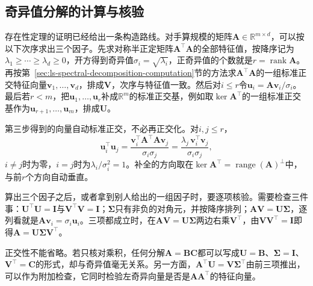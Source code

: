 \subsection{奇异值分解的计算与核验}
\label{sec:svd-computation}
\label{sec:svd-verification-geometry}

存在性定理的证明已经给出一条构造路线。对手算规模的矩阵$\bm A\in\mathbb R^{m\times d}$，可以按以下次序求出三个因子。先求对称半正定矩阵$\bm A^\top\bm A$的全部特征值，按降序记为$\lambda_1\geq\cdots\geq\lambda_d\geq0$，开方得到奇异值$\sigma_i=\sqrt{\lambda_i}$，正奇异值的个数就是$r=\operatorname{rank}\bm A$。再按第~\ref{sec:ls-spectral-decomposition-computation}节的方法求$\bm A^\top\bm A$的一组标准正交特征向量$\bm v_1,\ldots,\bm v_d$，排成$\bm V$，次序与特征值一致。然后对$i\leq r$令$\bm u_i=\bm A\bm v_i/\sigma_i$。最后若$r<m$，把$\bm u_1,\ldots,\bm u_r$补成$\mathbb R^m$的标准正交基，例如取$\ker\bm A^\top$的一组标准正交基作为$\bm u_{r+1},\ldots,\bm u_m$，排成$\bm U$。

第三步得到的向量自动标准正交，不必再正交化。对$i,j\leq r$，
\[
 \bm u_i^\top\bm u_j=\frac{\bm v_i^\top\bm A^\top\bm A\bm v_j}{\sigma_i\sigma_j}=\frac{\lambda_j\,\bm v_i^\top\bm v_j}{\sigma_i\sigma_j},
\]
$i\neq j$时为零，$i=j$时为$\lambda_i/\sigma_i^2=1$。补全的方向取在$\ker\bm A^\top=\operatorname{range}(\bm A)^\perp$中，与前$r$个方向自动垂直。

算出三个因子之后，或者拿到别人给出的一组因子时，要逐项核验。需要检查三件事：$\bm U^\top\bm U=\bm I$与$\bm V^\top\bm V=\bm I$；$\bm\Sigma$只有非负的对角元，并按降序排列；$\bm A\bm V=\bm U\bm\Sigma$，逐列看就是$\bm A\bm v_i=\sigma_i\bm u_i$。三项都成立时，在$\bm A\bm V=\bm U\bm\Sigma$两边右乘$\bm V^\top$，由$\bm V\bm V^\top=\bm I$即得$\bm A=\bm U\bm\Sigma\bm V^\top$。

正交性不能省略。若只核对乘积，任何分解$\bm A=\bm B\bm C$都可以写成$\bm U=\bm B$、$\bm\Sigma=\bm I$、$\bm V^\top=\bm C$的形式，却与奇异值毫无关系。另一方面，$\bm A^\top\bm U=\bm V\bm\Sigma^\top$由前三项推出，可以作为附加检查，它同时检验左奇异向量是否是$\bm A\bm A^\top$的特征向量。

